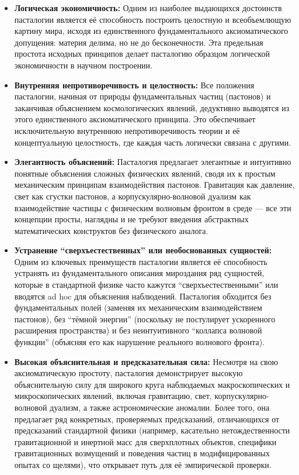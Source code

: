 \documentclass[pdflatex,sn-mathphys-num]{sn-jnl}
\begin{document}
\begin{itemize}
    \item \textbf{Логическая экономичность:} Одним из наиболее выдающихся достоинств пасталогии является её способность построить целостную и всеобъемлющую картину мира, исходя из единственного фундаментального аксиоматического допущения: материя делима, но не до бесконечности. Эта предельная простота исходных принципов делает пасталогию образцом логической экономичности в научном построении.
    
    \item \textbf{Внутренняя непротиворечивость и целостность:} Все положения пасталогии, начиная от природы фундаментальных частиц (пастонов) и заканчивая объяснением космологических явлений, дедуктивно выводятся из этого единственного аксиоматического принципа. Это обеспечивает исключительную внутреннюю непротиворечивость теории и её концептуальную целостность, где каждая часть логически связана с другими.
    
    \item \textbf{Элегантность объяснений:} Пасталогия предлагает элегантные и интуитивно понятные объяснения сложных физических явлений, сводя их к простым механическим принципам взаимодействия пастонов. Гравитация как давление, свет как сгустки пастонов, а корпускулярно-волновой дуализм как взаимодействие частицы с физическим волновым фронтом в среде --- все эти концепции просты, наглядны и не требуют введения абстрактных математических конструктов без физического аналога.
    
    \item \textbf{Устранение ``сверхъестественных'' или необоснованных сущностей:} Одним из ключевых преимуществ пасталогии является её способность устранять из фундаментального описания мироздания ряд сущностей, которые в стандартной физике часто кажутся ``сверхъестественными'' или вводятся ad hoc для объяснения наблюдений. Пасталогия обходится без фундаментальных полей (заменяя их механическим взаимодействием пастонов), без ``тёмной энергии'' (поскольку не постулирует ускоренного расширения пространства) и без неинтуитивного ``коллапса волновой функции'' (объясняя его как нарушение реального волнового фронта).
    
    \item \textbf{Высокая объяснительная и предсказательная сила:} Несмотря на свою аксиоматическую простоту, пасталогия демонстрирует высокую объяснительную силу для широкого круга наблюдаемых макроскопических и микроскопических явлений, включая гравитацию, свет, корпускулярно-волновой дуализм, а также астрономические аномалии. Более того, она предлагает ряд конкретных, проверяемых предсказаний, отличающихся от предсказаний стандартной физики (например, касательно нетождественности гравитационной и инертной масс для сверхплотных объектов, специфики гравитационных возмущений и поведения частиц в модифицированных опытах со щелями), что открывает путь для её эмпирической проверки.
\end{itemize}
\end{document}
